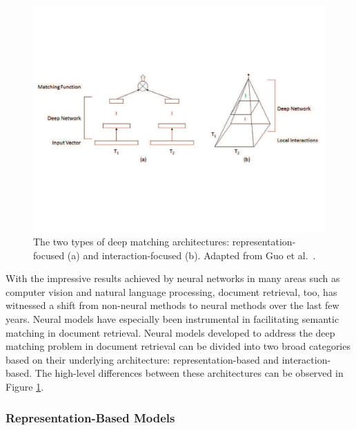 \begin{figure}[t!]
\centering
  \includegraphics[width=5in]{figures/deep_matching.pdf}
\caption{The two types of deep matching architectures: representation-focused (a) and interaction-focused (b). Adapted from Guo et al.~\cite{guo2016deep}.}
\label{fig:deep_matching}
\end{figure}

With the impressive results achieved by neural networks in many areas such as computer vision and natural language processing, document retrieval, too, has witnessed a shift from non-neural methods to neural methods over the last few years.
Neural models have especially been instrumental in facilitating semantic matching in document retrieval.
Neural models developed to address the deep matching problem in document retrieval can be divided into two broad categories based on their underlying architecture: representation-based and interaction-based.
The high-level differences between these architectures can be observed in Figure \ref{fig:deep_matching}.

\subsubsection{Representation-Based Models}


